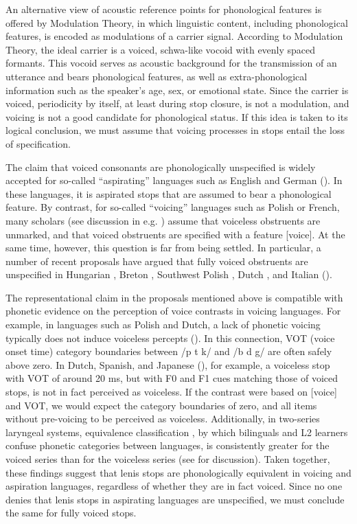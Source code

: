\documentclass[output=paper]{langscibook}
\begin{document}
An alternative view of acoustic reference points for phonological features is offered by  Modulation Theory, in which linguistic content, including phonological features, is encoded as modulations of a carrier signal. According to Modulation Theory, the ideal carrier is a voiced, schwa-like vocoid with evenly spaced formants. This vocoid serves as acoustic background for the transmission of an utterance and bears phonological features, as well as extra-phonological information such as the speaker’s age, sex, or emotional state. Since the carrier is voiced, periodicity by itself, at least during stop closure, is not a modulation, and voicing is not a good candidate for phonological status. If this idea is taken to its logical conclusion, we must assume that voicing processes in stops entail the loss of specification.

The claim that voiced consonants are phonologically unspecified is widely accepted for so-called “aspirating” languages such as English and German (\citealt{IversonSalmons1995}). In these languages, it is aspirated stops that are assumed to bear a phonological feature. By contrast, for so-called “voicing” languages such as Polish or French, many scholars (see discussion in e.g. \citealt{BeckmanEtAl2013}) assume that voiceless obstruents are unmarked, and that voiced obstruents are specified with a feature [voice]. At the same time, however, this question is far from being settled. In particular, a number of recent proposals have argued that fully voiced obstruents are unspecified in Hungarian \citep{Blaho2008}, Breton \citep{Iosad2012}, Southwest Polish \citep{Cyran2014}, Dutch \citep{Hulst2015}, and Italian (\citealt{BalognéBércesHuszthy2018}).

The representational claim in the proposals mentioned above is compatible with phonetic evidence on the perception of voice contrasts in voicing languages. For example, in languages such as Polish and Dutch, a lack of phonetic voicing typically does not induce voiceless percepts (\citealt{AlphenSmits2004,SchwartzArndt2018,SchwartzEtAl2019}). In this connection, VOT (voice onset time) category boundaries between /p t k/ and /b d g/ are often safely above zero. In Dutch, Spanish, and Japanese (\citealt{FlegeEefting1987a,FlegeEefting1987b,WilsonHashimoto2013}), for example, a voiceless stop with VOT of around 20 ms, but with F0 and F1 cues matching those of voiced stops, is not in fact perceived as voiceless. If the contrast were based on [voice] and VOT, we would expect the category boundaries of zero, and all items without pre-voicing to be perceived as voiceless. Additionally, in two-series laryngeal systems, equivalence classification \citep{Flege1987}, by which bilinguals and L2 learners confuse phonetic categories between languages, is consistently greater for the voiced series than for the voiceless series (see \citealt{Schwartz2022} for discussion). Taken together, these findings suggest that lenis stops are phonologically equivalent in voicing and aspiration languages, regardless of whether they are in fact voiced. Since no one denies that lenis stops in aspirating languages are unspecified, we must conclude the same for fully voiced stops.
\end{document}
